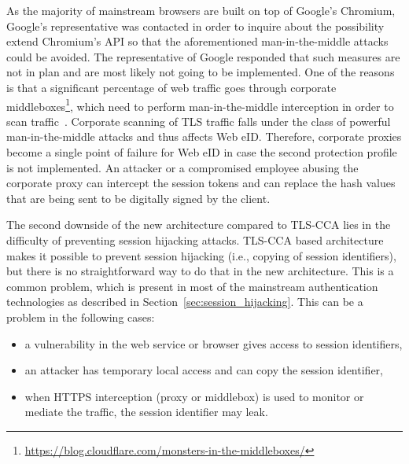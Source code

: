 As the majority of mainstream browsers are built on top of Google's Chromium, Google's representative was contacted in order to inquire about the possibility extend Chromium's API so that the aforementioned man-in-the-middle attacks could be avoided. The representative of Google responded that such measures are not in plan and are most likely not going to be implemented. One of the reasons is that a significant percentage of web traffic goes through corporate middleboxes\footnote{\url{https://blog.cloudflare.com/monsters-in-the-middleboxes/}}, which need to perform man-in-the-middle interception in order to scan traffic~\cite{DBLP:conf/ndss/DurumericMSBSBB17}. Corporate scanning of TLS traffic falls under the class of powerful man-in-the-middle attacks and thus affects Web eID. Therefore, corporate proxies become a single point of failure for Web eID in case the second protection profile is not implemented. An attacker or a compromised employee abusing the corporate proxy can intercept the session tokens and can replace the hash values that are being sent to be digitally signed by the client.

The second downside of the new architecture compared to TLS-CCA lies in the difficulty of preventing session hijacking attacks. TLS-CCA based architecture makes it possible to prevent session hijacking (i.e., copying of session identifiers), but there is no straightforward way to do that in the new architecture. This is a common problem, which is present in most of the mainstream authentication technologies as described in Section~\ref{sec:session_hijacking}. This can be a problem in the following cases:
\begin{itemize}
 \item a vulnerability in the web service or browser gives access to session identifiers,
 \item an attacker has temporary local access and can copy the session identifier,
 \item when HTTPS interception (proxy or middlebox) is used to monitor or mediate the traffic, the session identifier may leak.
 \end{itemize}
